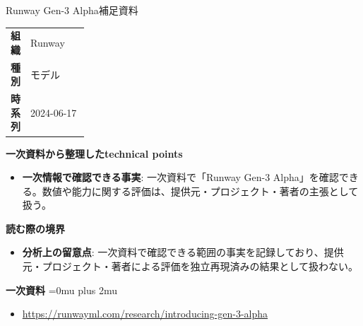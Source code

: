 \begin{technicalnote}{Runway Gen-3 Alpha}{補足資料}
\begingroup
\begin{tabularx}{\linewidth}{@{}>{\bfseries}p{0.22\linewidth}X@{}}
組織 & Runway \\
種別 & モデル \\
時系列 & 2024-06-17 \\
\end{tabularx}
\smallskip
{\bfseries 一次資料から整理したtechnical points}
\begin{itemize}[leftmargin=1.5em,itemsep=0.35em]
\item \textbf{一次情報で確認できる事実}: 一次資料で「Runway Gen-3 Alpha」を確認できる。数値や能力に関する評価は、提供元・プロジェクト・著者の主張として扱う。
\end{itemize}
\begin{minipage}{\linewidth}
{\bfseries 読む際の境界}
\begin{itemize}[leftmargin=1.5em,itemsep=0.35em]
\item \textbf{分析上の留意点}: 一次資料で確認できる範囲の事実を記録しており、提供元・プロジェクト・著者による評価を独立再現済みの結果として扱わない。
\end{itemize}
\begin{samepage}
{\bfseries 一次資料}
\begingroup\sloppy
\Urlmuskip=0mu plus 2mu\relax
\begin{itemize}[leftmargin=1.5em,itemsep=0.25em]
\item {\scriptsize\url{https://runwayml.com/research/introducing-gen-3-alpha}}
\end{itemize}
\endgroup
\end{samepage}
\end{minipage}
\endgroup
\end{technicalnote}
\medskip

